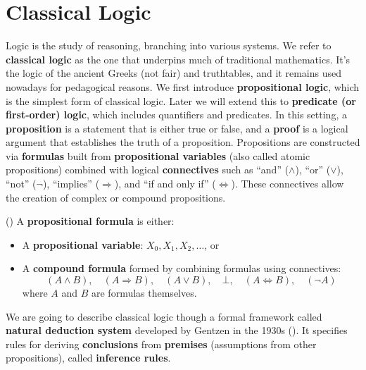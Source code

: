
\section{Classical Logic}

Logic is the study of reasoning, branching into various systems.
We refer to \textbf{classical logic} as the one that underpins much 
of traditional mathematics. 
It's the logic of the ancient Greeks (not fair) and truthtables, and it remains 
used nowadays for pedagogical reasons.
We first introduce \textbf{propositional logic}, which is the simplest 
form of classical logic. 
Later we will extend this to \textbf{predicate (or first-order) logic}, which includes 
quantifiers and predicates.
In this setting, a \textbf{proposition} is a statement that is either true or false, 
and a \textbf{proof} is a logical argument that establishes the truth of a 
proposition.
Propositions are constructed via \textbf{formulas} built from 
\textbf{propositional variables} 
(also called atomic propositions) combined with logical \textbf{connectives} such as ``and'' ($\wedge$), 
``or'' ($\vee$), ``not'' ($\neg$), ``implies'' ($\Rightarrow$), and ``if and only if'' ($\Leftrightarrow$). 
These connectives allow the creation of complex or compound propositions.
\begin{definition}(\cite{thompson1999types})
A \textbf{propositional formula} is either:
\begin{itemize}
    \item A \textbf{propositional variable}: $X_0, X_1, X_2, \ldots$, or
    \item A \textbf{compound formula} formed by combining formulas using connectives:
    \[
        (A \wedge B), \quad (A \Rightarrow B), \quad (A \vee B), \quad \bot, \quad (A \Leftrightarrow B), \quad (\neg A)
    \]
    where $A$ and $B$ are formulas themselves.
\end{itemize}
\end{definition}

We are going to describe classical logic though a formal framework 
called \textbf{natural deduction system}  developed by
Gentzen in the 1930s (\cite{wadler2015propositions}). It specifies 
rules for deriving 
\textbf{conclusions} from \textbf{premises} (assumptions from other propositions), 
called \textbf{inference rules}.

